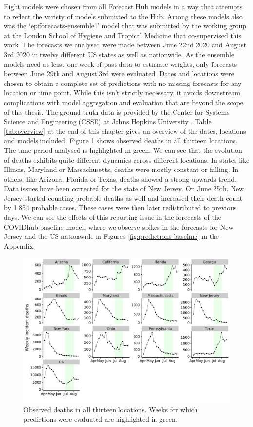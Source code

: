 \documentclass[
]{book}
\begin{document}
Eight models were chosen from all Forecast Hub models in a way that attempts to reflect the variety of models submitted to the Hub. Among these models also was the `epiforecasts-ensemble1' model that was submitted by the working group at the London School of Hygiene and Tropical Medicine that co-supervised this work. The forecasts we analysed were made between June 22nd 2020 and August 3rd 2020 in twelve different US states as well as nationwide. As the ensemble models need at least one week of past data to estimate weights, only forecasts between June 29th and August 3rd were evaluated. Dates and locations were chosen to obtain a complete set of predictions with no missing forecasts for any location or time point. While this isn't strictly necessary, it avoids downstream complications with model aggregation and evaluation that are beyond the scope of this thesis.
The ground truth data is provided by the Center for Systems Science and Engineering (CSSE) at Johns Hopkins University \citep{dongInteractiveWebbasedDashboard2020}. Table \ref{tab:overview} at the end of this chapter gives an overview of the dates, locations and models included. Figure \ref{fig:us-data} shows observed deaths in all thirteen locations. The time period analysed is highlighted in green. We can see that the evolution of deaths exhibits quite different dynamics across different locations. In states like Illinois, Maryland or Massachusetts, deaths were mostly constant or falling. In others, like Arizona, Florida or Texas, deaths showed a strong upwards trend. Data issues have been corrected for the state of New Jersey. On June 25th, New Jersey started counting probable deaths as well and increased their death count by 1 854 probable cases. These cases were then later redistributed to previous days. We can see the effects of this reporting issue in the forecasts of the COVIDhub-baseline model, where we observe spikes in the forecasts for New Jersey and the US nationwide in Figures \ref{fig:predictions-baseline} in the Appendix.

\begin{figure}
\includegraphics[width=0.95\linewidth]{../visualisation/chapter-2-background-data/plot-observations} \caption{Observed deaths in all thirteen locations. Weeks for which predictions were evaluated are highlighted in green.}\label{fig:us-data}
\end{figure}
\end{document}
